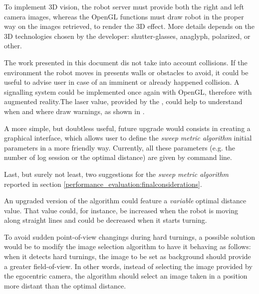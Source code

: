 %
To implement 3D vision, the robot server must provide both the right and left camera images,
whereas the OpenGL functions must draw robot in the proper way on the images retrieved, to render
the 3D effect. More details depends on the 3D technologies chosen by the developer: shutter-glasses,
anaglyph, polarized, or other.
%

%
The work presented in this document dis not take into account 
collisions. If the environment the robot moves in presents walls 
or obstacles to avoid, it could be useful to advise user in case 
of an imminent or already happened collision.
%
A signalling system could be implemented once again with OpenGL, therefore 
with augmented reality.The laser value, provided by the \morduc{},
could help to understand when and where draw warnings, as shown in 
\cite{morduc:macalusodetommaso}.
%

%
A more simple, but doubtless useful, future upgrade would consists in 
creating a graphical interface, which allows user to define the
\textit{sweep metric algorithm} initial parameters in a more friendly way. 
%
Currently, all these parameters (e.g. the number of log session or the 
optimal distance) are given by command line.
%

%
Last, but surely not least, two suggestions for the 
\textit{sweep metric algorithm} reported in section 
\ref{performance_evaluation:finalconsiderations}.
%

%
An upgraded version of the algorithm could feature a 
\textit{variable} optimal distance value. That value 
could, for instance, be increased when the robot is moving 
along straight lines and could be decreased when it starts 
turning.
%

%
To avoid sudden point-of-view changings during hard turnings, 
a possible solution would be to modify the image selection algorithm 
to have it behaving as follows: when it detects hard turnings, the 
image to be set as background should provide a greater field-of-view. 
In other words, instead of selecting the image provided by the 
egocentric camera, the algorithm should select an image taken 
in a position more distant than the optimal distance.
%
